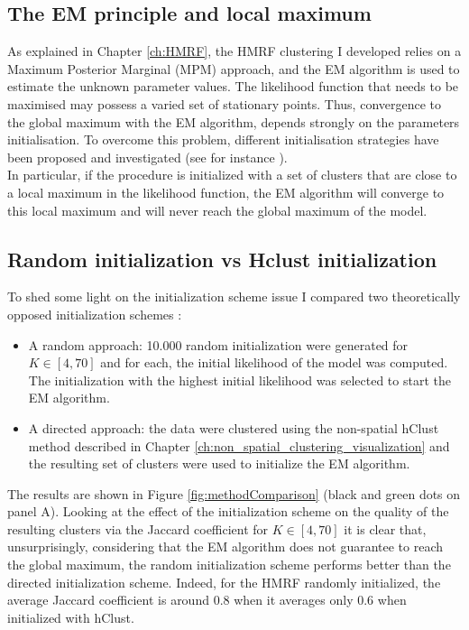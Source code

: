 	\subsection{The EM principle and local maximum}
As explained in Chapter \ref{ch:HMRF}, the HMRF clustering I developed relies on a Maximum Posterior Marginal (MPM) approach, and the EM algorithm is used to estimate the unknown parameter values. The likelihood function that needs to be maximised may possess a varied set of stationary points. Thus, convergence to the global maximum with the EM algorithm, depends strongly on the parameters initialisation. To overcome this problem, different initialisation strategies have been proposed and investigated (see for instance \citep{biernacki03,karlis03,mclachlan04}).\\

In particular, if the procedure is initialized with a set of clusters that are close to a local maximum in the likelihood function, the EM algorithm will converge to this local maximum and will never reach the global maximum of the model.

	\subsection{Random initialization vs Hclust initialization}
	To shed some light on the initialization scheme issue I compared two theoretically opposed initialization schemes :
\begin{itemize}
	\item A random approach: 10.000 random initialization were generated for $K \in [4,70]$ and for each, the initial likelihood of the model was computed. The initialization with the highest initial likelihood was selected to start the EM algorithm.
	\item A directed approach: the data were clustered using the non-spatial hClust method described in Chapter \ref{ch:non_spatial_clustering_visualization} and the resulting set of clusters were used to initialize the EM algorithm.
\end{itemize}

The results are shown in Figure \ref{fig:methodComparison} (black and green dots on panel A). Looking at the effect of the initialization scheme on the quality of the resulting clusters via the Jaccard coefficient for $K \in [4,70]$ it is clear that, unsurprisingly, considering that the EM algorithm does not guarantee to reach the global maximum, the random initialization scheme performs better than the directed initialization scheme. Indeed, for the HMRF randomly initialized, the average Jaccard coefficient is around $0.8$ when it averages only $0.6$ when initialized with hClust.\\

